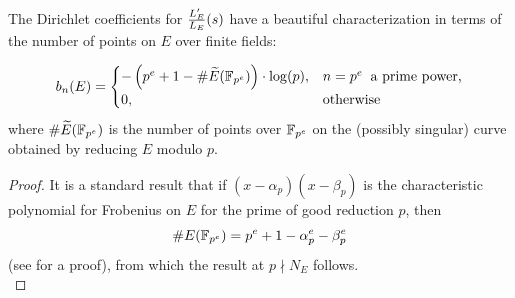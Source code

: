 The Dirichlet coefficients for $\frac{L_E^{\prime}}{L_E}(s)$ have a beautiful characterization in terms of the number of points on $E$ over finite fields:
\begin{proposition}
\begin{equation}
b_n(E) = \begin{cases}
-\left(p^e + 1 - \#\widetilde{E}(\mathbb{F}_{p^e})\right)\cdot \log(p), & n=p^e\;\;\text{a prime power,} \\
0, & \text{otherwise} \end{cases}
\end{equation}
where $\#\widetilde{E}(\mathbb{F}_{p^e})$ is the number of points over $\mathbb{F}_{p^e}$ on the (possibly singular) curve obtained by reducing $E$ modulo $p$.
\end{proposition}

\begin{proof}
It is a standard result that if $(x-\alpha_p)(x-\beta_p)$ is the characteristic polynomial for Frobenius on $E$ for the prime of good reduction $p$, then
\begin{equation}
\#E(\mathbb{F}_{p^e}) = p^e + 1 - \alpha_p^e - \beta_p^e
\end{equation}
(see \cite[pp. 134-136]{Sil-1985} for a proof), from which the result at $p \nmid N_E$ follows. \\


\end{proof}
